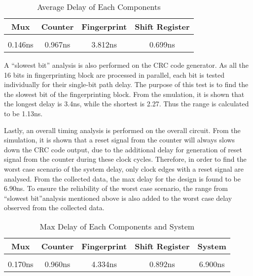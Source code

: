 \documentclass[10pt,journal,compsoc]{IEEEtran}
\begin{document}
\begin{table}[ht] 
\caption{Average Delay of Each Components} %
\centering %
\begin{tabular}{c c c c } %
\hline\hline %
Mux & Counter & Fingerprint & Shift Register\\ [0.5ex] %
\hline %
\\ [0.2 ex]
0.146ns & 0.967ns & 3.812ns & 0.699ns \\ [1ex] %
\hline %
\end{tabular} 
\label{table:nonlin} %
\end{table} 

    A “slowest bit” analysis is also performed on the CRC code generator. As all the 16 bits in fingerprinting block are processed in parallel, each bit is tested individually for their single-bit path delay. The purpose of this test is to find the the slowest bit of the fingerprinting block. From the smulation, it is shown that the longest delay is 3.4ns, while the shortest is 2.27. Thus the range is calculated to be 1.13ns.
    
    Lastly, an overall timing analysis is performed on the overall circuit. From the simulation, it is shown that a reset signal from the counter will always slows down the CRC code output, due to the additional delay for  generation of reset signal from the counter during these clock cycles. Therefore, in order to find the worst case scenario of the system delay, only clock edges with a reset signal are analysed. From the collected data, the max delay for the design is found to be 6.90ns. To ensure the reliability of the worst case scenario, the range from “slowest bit”analysis mentioned above is also added to the worst case delay observed from the collected data.
    
    \begin{table}[ht] 
\caption{Max Delay of Each Components and System} %
\centering %
\begin{tabular}{c c c c c} %
\hline\hline %
Mux & Counter & Fingerprint & Shift Register & System\\ [0.5ex] %
\hline %
\\ [0.2 ex]
0.170ns & 0.960ns & 4.334ns & 0.892ns & 6.900ns \\ [1ex] %
\hline %
\end{tabular} 
\label{table:nonlin} %
\end{table} 
\end{document}

